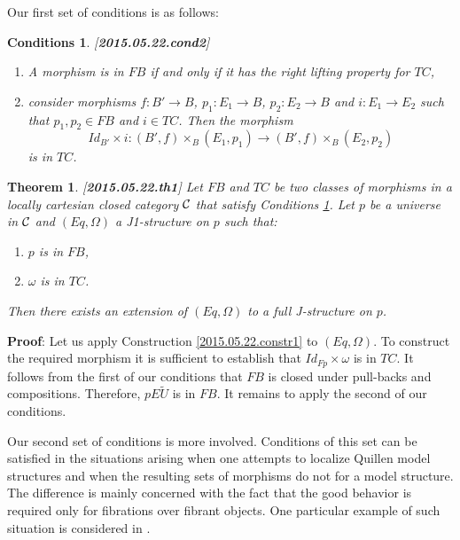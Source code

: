 \documentclass[12pt]{article}
\newenvironment{myproof}{{\bf Proof}:}{\vskip 5mm }
\newtheorem{theorem}[proposition]{Theorem}
\newtheorem{cond}[proposition]{Conditions}
\newcommand{\llabel}[1]{\label{#1}[{\bf #1}]}
\newcommand{\sr}{\rightarrow}
\newcommand{\wt}{\widetilde}
\begin{document}
Our first set of conditions is as follows:
%
\begin{cond}\llabel{2015.05.22.cond2}
\begin{enumerate}
\item A morphism is in $FB$ if and only if it has the right lifting property for $TC$,
\item consider morphisms $f: B'\sr B$, $p_1:E_1\sr B$, $p_2:E_2\sr B$ and $i:E_1\sr E_2$ such that $p_1,p_2\in FB$ and $i\in TC$. Then the morphism
%
$$Id_{B'}\times i: (B',f)\times_B(E_1,p_1)\sr (B',f)\times_B(E_2,p_2)$$
%
is in $TC$.
\end{enumerate}
\end{cond}
%
\begin{theorem}
\llabel{2015.05.22.th1}
Let $FB$ and $TC$ be two classes of morphisms in a locally cartesian closed category $\cal C$ that satisfy Conditions \ref{2015.05.22.cond2}. Let $p$ be a universe in $\cal C$ and $(Eq,\Omega)$ a J1-structure on $p$ such that:
%
\begin{enumerate}
\item $p$ is in $FB$,
\item $\omega$ is in $TC$.
\end{enumerate}
%
Then there exists an extension of $(Eq,\Omega)$ to a full J-structure on $p$.
\end{theorem}
%
\begin{myproof}
Let us apply Construction \ref{2015.05.22.constr1} to $(Eq,\Omega)$. To construct the required morphism it is sufficient to establish that $Id_{Fp}\times\omega$ is in $TC$. It follows from the first of our conditions that $FB$ is closed under pull-backs and compositions. Therefore, $pE\wt{U}$ is in $FB$. It remains to apply the second of our conditions.
\end{myproof}
% 





Our second set of conditions is more involved. Conditions of this set can be satisfied in the situations arising when one attempts to localize Quillen model structures and when the resulting sets of morphisms do not for a model structure. The difference is mainly concerned with the fact that the good behavior is required only for fibrations over fibrant objects. One particular example of such situation is considered in \cite[Section 3.3]{SRF}.
\end{document}
